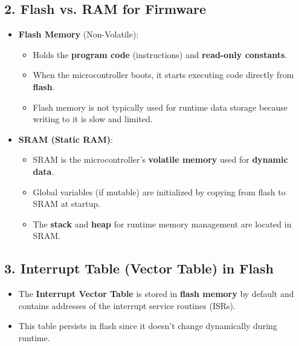 \documentclass{article}
\begin{document}
\subsection*{2. Flash vs. RAM for Firmware}
\begin{itemize}
    \item \textbf{Flash Memory} (Non-Volatile):
    \begin{itemize}
        \item Holds the \textbf{program code} (instructions) and \textbf{read-only constants}.
        \item When the microcontroller boots, it starts executing code directly from \textbf{flash}.
        \item Flash memory is not typically used for runtime data storage because writing to it is slow and limited.
    \end{itemize}
    \item \textbf{SRAM (Static RAM)}:
    \begin{itemize}
        \item SRAM is the microcontroller's \textbf{volatile memory} used for \textbf{dynamic data}.
        \item Global variables (if mutable) are initialized by copying from flash to SRAM at startup.
        \item The \textbf{stack} and \textbf{heap} for runtime memory management are located in SRAM.
    \end{itemize}
\end{itemize}

\subsection*{3. Interrupt Table (Vector Table) in Flash}
\begin{itemize}
    \item The \textbf{Interrupt Vector Table} is stored in \textbf{flash memory} by default and contains addresses of the interrupt service routines (ISRs).
    \item This table persists in flash since it doesn't change dynamically during runtime.
\end{itemize}
\end{document}
